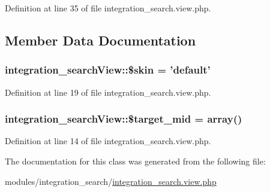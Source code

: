 Definition at line 35 of file integration\-\_\-search.\-view.\-php.



\subsection{Member Data Documentation}
\hypertarget{classintegration__searchView_a4281fc0752039ec4025ddaca5771f074}{
\subsubsection[{\$skin}]{\setlength{\rightskip}{0pt plus 5cm}integration\-\_\-search\-View\-::\$skin = 'default'}}\label{classintegration__searchView_a4281fc0752039ec4025ddaca5771f074}


Definition at line 19 of file integration\-\_\-search.\-view.\-php.

\hypertarget{classintegration__searchView_a17efafd7259acddb90e2c181bcfeaa38}{
\subsubsection[{\$target\-\_\-mid}]{\setlength{\rightskip}{0pt plus 5cm}integration\-\_\-search\-View\-::\$target\-\_\-mid = array()}}\label{classintegration__searchView_a17efafd7259acddb90e2c181bcfeaa38}


Definition at line 14 of file integration\-\_\-search.\-view.\-php.



The documentation for this class was generated from the following file\-:\begin{DoxyCompactItemize}
\item 
modules/integration\-\_\-search/\hyperlink{integration__search_8view_8php}{integration\-\_\-search.\-view.\-php}\end{DoxyCompactItemize}
